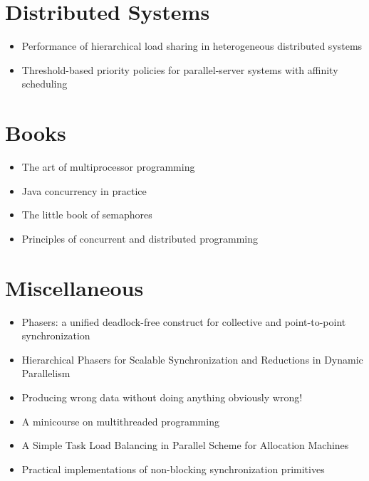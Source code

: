 \section{Distributed Systems}
\label{sec:lr-distributed-systems}

\begin{itemize}
\item Performance of hierarchical load sharing in heterogeneous
  distributed systems \cite{Lo1996}
\item Threshold-based priority policies for parallel-server systems
  with affinity scheduling \cite{Squillante2001}
\end{itemize}


\section{Books}
\label{sec:lr-books}

\begin{itemize}
\item The art of multiprocessor programming \cite{Herlihy2008}
\item Java concurrency in practice \cite{Goetz2006}
\item The little book of semaphores \cite{Downey2008}
\item Principles of concurrent and distributed programming
  \cite{Ben-Ari2006}
\end{itemize}


\section{Miscellaneous}
\label{sec:lr-miscellaneous}

\begin{itemize}
\item Phasers: a unified deadlock-free construct for collective and
  point-to-point synchronization \cite{Shirako2008}
\item Hierarchical Phasers for Scalable Synchronization and Reductions
  in Dynamic Parallelism \cite{Shirako2010}
\item Producing wrong data without doing anything obviously wrong!
  \cite{Mytkowicz2009}
\item A minicourse on multithreaded programming \cite{Leiserson1998}
\item A Simple Task Load Balancing in Parallel Scheme for Allocation
  Machines \cite{Rudolph1991}
\item Practical implementations of non-blocking synchronization
  primitives \cite{Moir1997}
\end{itemize}


